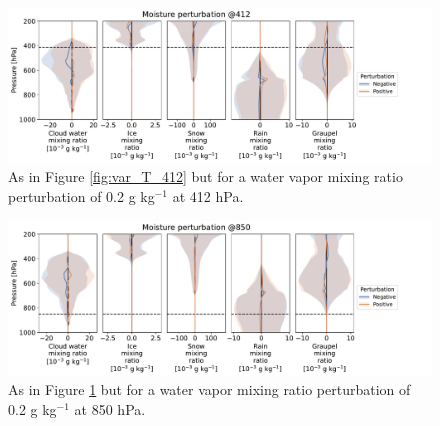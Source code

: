 \documentclass[draft]{agujournal2019}
\begin{document}
\begin{figure}[pth]
    \noindent\includegraphics[width=\textwidth]{figures/pert_var_q_0.0002_@412}
    \caption{As in Figure \ref{fig:var_T_412} but for a water vapor mixing ratio
    perturbation of 0.2 g kg$^{-1}$ at 412 hPa.}
    \label{fig:var_q_412}
\end{figure}

\begin{figure}[pth]
    \noindent\includegraphics[width=\textwidth]{figures/pert_var_q_0.0002_@850}
    \caption{As in Figure \ref{fig:var_q_412} but for a water vapor mixing ratio
    perturbation of 0.2 g kg$^{-1}$ at 850 hPa.}
    \label{fig:var_q_850}
\end{figure}
\end{document}
